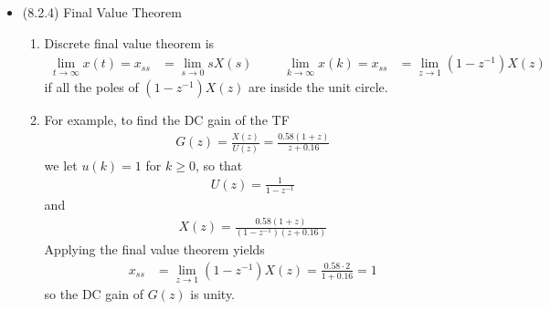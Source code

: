 \documentclass[landscape,14pt]{oblivoir}
\begin{document}
\begin{itemize}
\begin{enumerate}
\begin{figure}[h]
		\end{figure}
	\end{enumerate}
%
\newpage
%
	\item (8.2.4) Final Value Theorem 
	\begin{enumerate}
		\item Discrete final value theorem is 
		\begin{align*}
			\lim_{t \rightarrow \infty} x(t) = x_{ss} &= \lim_{s \rightarrow 0} sX(s) &&&
			\lim_{k \rightarrow \infty} x(k) = x_{ss} &= \lim_{z \rightarrow 1} (1-z^{-1}) X(z) 
		\end{align*}
		if all the poles of $(1-z^{-1}) X(z)$ are inside the unit circle. 
		\item For example, to find the DC gain of the TF
		\begin{align*}
			G(z) = \frac{X(z)}{U(z)} = \frac{0.58(1+z)}{z+0.16} 
		\end{align*}
		we let $u(k) =1 $ for $k \geq 0$, so that 
		\begin{align*}
			U(z) = \frac{1}{1-z^{-1}}
		\end{align*}
		and 
		\begin{align*}
			X(z) = \frac{0.58(1+z)}{(1-z^{-1})(z+0.16)}
		\end{align*}
		Applying the final value theorem yields 
		\begin{align*}
			x_{ss} &= \lim_{z \rightarrow 1} (1-z^{-1}) X(z) = \frac{0.58 \cdot 2}{1+0.16} = 1
		\end{align*}
		so the DC gain of $G(z)$ is unity. 
	\end{enumerate}
\end{itemize}
%
%
\newpage
%
\end{document}
